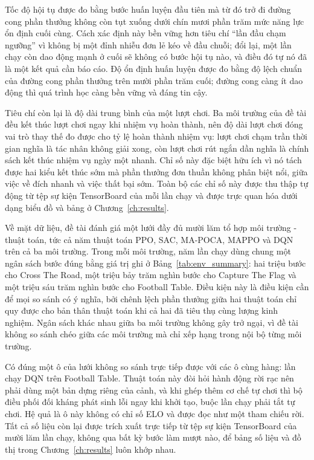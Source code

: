 \indent Tốc độ hội tụ được đo bằng bước huấn luyện đầu tiên mà từ đó
trở đi đường cong phần thưởng không còn tụt xuống dưới chín mươi phần trăm mức năng lực
ổn định cuối cùng. Cách xác định này bền vững hơn tiêu chí ``lần đầu chạm ngưỡng'' vì
không bị một đỉnh nhiễu đơn lẻ kéo về đầu chuỗi; đổi lại, một lần chạy còn dao động
mạnh ở cuối sẽ không có bước hội tụ nào, và điều đó tự nó đã là một kết quả cần báo cáo.
Độ ổn định huấn luyện được đo bằng độ lệch chuẩn của đường cong
phần thưởng trên mười phần trăm cuối; đường cong càng ít dao động thì quá
trình học càng bền vững và đáng tin cậy.

\indent Tiêu chí còn lại là độ dài trung bình của một lượt chơi. Ba
môi trường của đề tài đều kết thúc lượt chơi ngay khi nhiệm vụ hoàn thành, nên độ dài
lượt chơi đóng vai trò thay thế đo được cho tỷ lệ hoàn thành nhiệm vụ: lượt chơi chạm
trần thời gian nghĩa là tác nhân không giải xong, còn lượt chơi rút ngắn dần nghĩa là
chính sách kết thúc nhiệm vụ ngày một nhanh. Chỉ số này đặc biệt hữu ích vì nó tách được
hai kiểu kết thúc sớm mà phần thưởng đơn thuần không phân biệt nổi, giữa việc về đích
nhanh và việc thất bại sớm. Toàn bộ các chỉ số này được thu thập tự động
từ tệp sự kiện TensorBoard của mỗi lần chạy và được trực quan hóa dưới dạng biểu đồ và
bảng ở Chương~\ref{ch:results}.

\indent Về mặt dữ liệu, đề tài đánh giá một lưới đầy đủ mười lăm tổ hợp môi trường -
thuật toán, tức cả năm thuật toán PPO, SAC, MA-POCA, MAPPO và DQN trên cả ba môi trường.
Trong mỗi môi trường, năm lần chạy dùng chung một ngân sách bước đúng bằng giá trị ghi ở
Bảng~\ref{tab:env_summary}: hai triệu bước cho Cross The Road, một triệu bảy trăm nghìn
bước cho Capture The Flag và một triệu sáu trăm nghìn bước cho Football Table. Điều kiện
này là điều kiện cần để mọi so sánh có ý nghĩa, bởi chênh lệch phần thưởng giữa hai thuật
toán chỉ quy được cho bản thân thuật toán khi cả hai đã tiêu thụ cùng lượng kinh nghiệm.
Ngân sách khác nhau giữa ba môi trường không gây trở ngại, vì đề tài không so sánh chéo
giữa các môi trường mà chỉ xếp hạng trong nội bộ từng môi trường.

\indent Có đúng một ô của lưới không so sánh trực tiếp được với các ô cùng hàng: lần
chạy DQN trên Football Table. Thuật toán này đòi hỏi hành động rời rạc nên phải dùng một
bản dựng riêng của cảnh, và khi ghép thêm cơ chế tự chơi thì bộ điều phối đối kháng phát
sinh lỗi ngay khi khởi tạo, buộc lần chạy phải tắt tự chơi. Hệ quả là ô này không có chỉ
số ELO và được đọc như một tham chiếu rời. Tất cả số liệu còn lại được trích xuất trực
tiếp từ tệp sự kiện TensorBoard của mười lăm lần chạy, không qua bất kỳ bước làm mượt
nào, để bảng số liệu và đồ thị trong Chương~\ref{ch:results} luôn khớp nhau.
